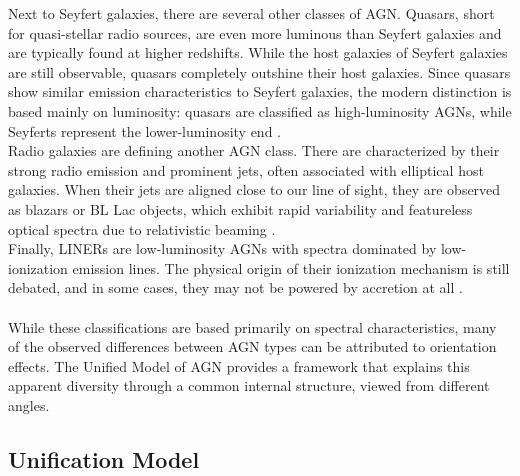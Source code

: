Next to Seyfert galaxies, there are several other classes of AGN. Quasars, short for quasi-stellar radio sources, are even more luminous than Seyfert galaxies and are typically found at higher redshifts. While the host galaxies of Seyfert galaxies are still observable, quasars completely outshine their host galaxies. Since quasars show similar emission characteristics to Seyfert galaxies, the modern distinction is based mainly on luminosity: quasars are classified as high-luminosity AGNs, while Seyferts represent the lower-luminosity end \parencite{netzer2013agn}.\\
Radio galaxies are defining another AGN class. There are characterized by their strong radio emission and prominent jets, often associated with elliptical host galaxies. When their jets are aligned close to our line of sight, they are observed as blazars or BL Lac objects, which exhibit rapid variability and featureless optical spectra due to relativistic beaming \parencite{netzer2013agn}.\\
Finally, LINERs are low-luminosity AGNs with spectra dominated by low-ionization emission lines. The physical origin of their ionization mechanism is still debated, and in some cases, they may not be powered by accretion at all \parencite{netzer2013agn}.\\\\
While these classifications are based primarily on spectral characteristics, many of the observed differences between AGN types can be attributed to orientation effects. The Unified Model of AGN provides a framework that explains this apparent diversity through a common internal structure, viewed from different angles.

\subsection{Unification Model}
\label{sec:unification_model}

